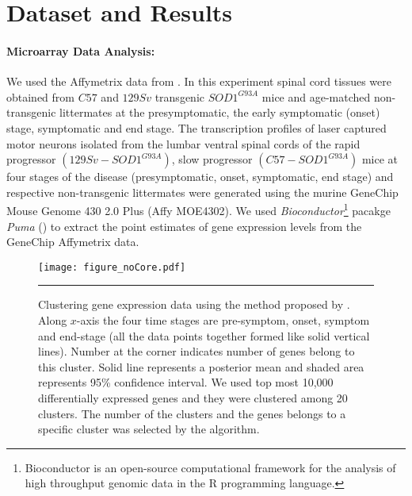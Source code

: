 \section{Dataset and Results}

\paragraph{Microarray Data Analysis:}
We used the Affymetrix data from \cite{Nardo:2013}.  In this experiment spinal cord tissues were obtained from $C57$ and $129Sv$ transgenic $SOD1^{G93A}$ mice and age-matched non-transgenic littermates at the presymptomatic, the early symptomatic (onset) stage, symptomatic and end stage.  The transcription profiles of laser captured motor neurons isolated from the lumbar ventral spinal cords of the rapid progressor $(129Sv-SOD1^{G93A})$, slow progressor $(C57-SOD1^{G93A})$ mice at four stages of the disease (presymptomatic, onset, symptomatic, end stage) and respective non-transgenic littermates were generated using the murine GeneChip Mouse Genome 430 2.0 Plus (Affy MOE4302). We used \emph{Bioconductor}\footnote{Bioconductor is an open-source computational framework for the analysis of high throughput genomic data in the R programming language.} pacakge \emph{Puma} (\cite{puma}) to extract the point estimates of gene expression levels from the GeneChip Affymetrix data.

\begin{figure}
	\centering
		\texttt{[image: figure\_noCore.pdf]}
		\rule{35em}{0.5pt}
	\caption[Clustering gene expression data no coregionalization]
		{Clustering gene expression data using the method proposed by \cite{Hensman:2013}. Along $x$-axis the four time stages are pre-symptom, onset, symptom and end-stage (all the data points together formed like solid vertical lines). Number at the corner indicates number of genes belong to this cluster. Solid line represents a posterior mean and shaded area represents 95\% confidence interval. We used top most 10,000 differentially expressed genes and they were clustered among 20 clusters. The number of the clusters and the genes belongs to a specific cluster was selected by the algorithm.}
	\label{fig:clsNoCoregionalization}
\end{figure}

